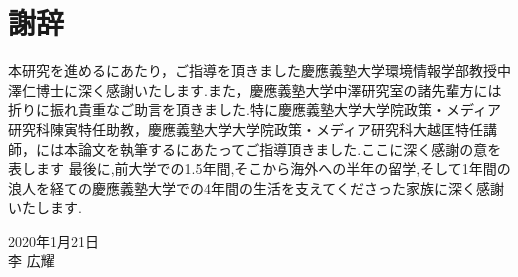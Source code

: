 \chapter*{謝辞}
本研究を進めるにあたり，ご指導を頂きました慶應義塾大学環境情報学部教授中澤仁博士に深く感謝いたします.また，慶應義塾大学中澤研究室の諸先輩方には折りに振れ貴重なご助言を頂きました.特に慶應義塾大学大学院政策・メディア研究科陳寅特任助教，慶應義塾大学大学院政策・メディア研究科大越匡特任講師，には本論文を執筆するにあたってご指導頂きました.ここに深く感謝の意を表します
最後に,前大学での1.5年間,そこから海外への半年の留学,そして1年間の浪人を経ての慶應義塾大学での4年間の生活を支えてくださった家族に深く感謝いたします.

\begin{flushright}
2020年1月21日\\
李 広耀
\end{flushright}
